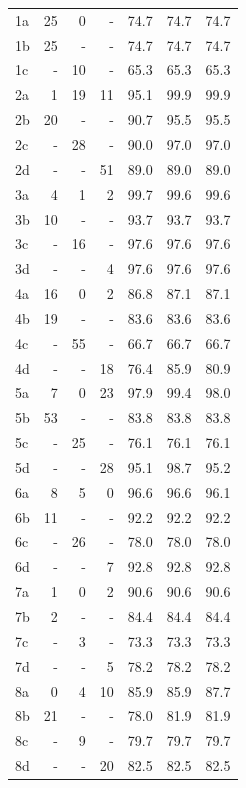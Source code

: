 \begin{longtable}{lrrrrrr}
  1a & 25 & 0 & - & 74.7 & 74.7 & 74.7 \\
  1b & 25 & - & - & 74.7 & 74.7 & 74.7 \\
  1c & - & 10 & - & 65.3 & 65.3 & 65.3 \\
  \addlinespace
  2a & 1 & 19 & 11 & 95.1 & 99.9 & 99.9 \\
  2b & 20 & - & - & 90.7 & 95.5 & 95.5 \\
  2c & - & 28 & - & 90.0 & 97.0 & 97.0 \\
  2d & - & - & 51 & 89.0 & 89.0 & 89.0 \\
  \addlinespace
  3a & 4 & 1 & 2 & 99.7 & 99.6 & 99.6 \\
  3b & 10 & - & - & 93.7 & 93.7 & 93.7 \\
  3c & - & 16 & - & 97.6 & 97.6 & 97.6 \\
  3d & - & - & 4 & 97.6 & 97.6 & 97.6 \\
  \addlinespace
  4a & 16 & 0 & 2 & 86.8 & 87.1 & 87.1 \\
  4b & 19 & - & - & 83.6 & 83.6 & 83.6 \\
  4c & - & 55 & - & 66.7 & 66.7 & 66.7 \\
  4d & - & - & 18 & 76.4 & 85.9 & 80.9 \\
  \addlinespace
  5a & 7 & 0 & 23 & 97.9 & 99.4 & 98.0 \\
  5b & 53 & - & - & 83.8 & 83.8 & 83.8 \\
  5c & - & 25 & - & 76.1 & 76.1 & 76.1 \\
  5d & - & - & 28 & 95.1 & 98.7 & 95.2 \\
  \addlinespace
  6a & 8 & 5 & 0 & 96.6 & 96.6 & 96.1 \\
  6b & 11 & - & - & 92.2 & 92.2 & 92.2 \\
  6c & - & 26 & - & 78.0 & 78.0 & 78.0 \\
  6d & - & - & 7 & 92.8 & 92.8 & 92.8 \\
  \addlinespace
  7a & 1 & 0 & 2 & 90.6 & 90.6 & 90.6 \\
  7b & 2 & - & - & 84.4 & 84.4 & 84.4 \\
  7c & - & 3 & - & 73.3 & 73.3 & 73.3 \\
  7d & - & - & 5 & 78.2 & 78.2 & 78.2 \\
  \addlinespace
  8a & 0 & 4 & 10 & 85.9 & 85.9 & 87.7 \\
  8b & 21 & - & - & 78.0 & 81.9 & 81.9 \\
  8c & - & 9 & - & 79.7 & 79.7 & 79.7 \\
  8d & - & - & 20 & 82.5 & 82.5 & 82.5 \\

\end{longtable}
